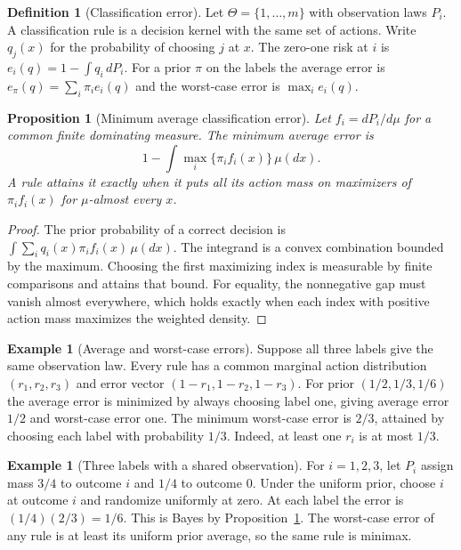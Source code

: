\documentclass[11pt,oneside]{book}
\newtheorem{proposition}[theorem]{Proposition}
\theoremstyle{definition}
\newtheorem{definition}[theorem]{Definition}
\newtheorem{example}[theorem]{Example}
\theoremstyle{remark}
\begin{document}
\begin{definition}[Classification error]
\label{def:multiclass-error}
Let $\Theta=\{1,\ldots,m\}$ with observation laws $P_i$. A
classification rule is a decision kernel with the same set of
actions. Write $q_j(x)$ for the probability of choosing $j$ at $x$.
The zero-one risk at $i$ is $e_i(q)=1-\int q_i\,dP_i$.
For a prior $\pi$ on the labels the average error is
$e_\pi(q)=\sum_i\pi_i e_i(q)$ and the worst-case error is
$\max_i e_i(q)$.
\end{definition}

\begin{proposition}[Minimum average classification error]
\label{prop:multiclass-bayes-error}
Let $f_i=dP_i/d\mu$ for a common finite dominating measure.
The minimum average error is
\[
1-\int \max_i\{\pi_i f_i(x)\}\,\mu(dx).
\]
A rule attains it exactly when it puts all its action mass on
maximizers of $\pi_i f_i(x)$ for $\mu$-almost every $x$.
\end{proposition}
\begin{proof}
The prior probability of a correct decision is
$\int\sum_i q_i(x)\pi_i f_i(x)\,\mu(dx)$.
The integrand is a convex combination bounded by the maximum.
Choosing the first maximizing index is measurable by finite
comparisons and attains that bound. For equality, the nonnegative
gap must vanish almost everywhere, which holds exactly when
each index with positive action mass maximizes the weighted density.
\end{proof}

\begin{example}[Average and worst-case errors]
\label{ex:multiclass-no-observation}
Suppose all three labels give the same observation law. Every
rule has a common marginal action distribution $(r_1,r_2,r_3)$
and error vector $(1-r_1,1-r_2,1-r_3)$. For prior
$(1/2,1/3,1/6)$ the average error is minimized by always choosing
label one, giving average error $1/2$ and worst-case error one.
The minimum worst-case error is $2/3$, attained by choosing
each label with probability $1/3$. Indeed, at least one $r_i$
is at most $1/3$.
\end{example}

\begin{example}[Three labels with a shared observation]
\label{ex:multiclass-shared-observation}
For $i=1,2,3$, let $P_i$ assign mass $3/4$ to outcome $i$
and $1/4$ to outcome $0$. Under the uniform prior, choose $i$
at outcome $i$ and randomize uniformly at zero. At each label
the error is $(1/4)(2/3)=1/6$. This is Bayes by
Proposition~\ref{prop:multiclass-bayes-error}. The worst-case
error of any rule is at least its uniform prior average,
so the same rule is minimax.
\end{example}
\end{document}
